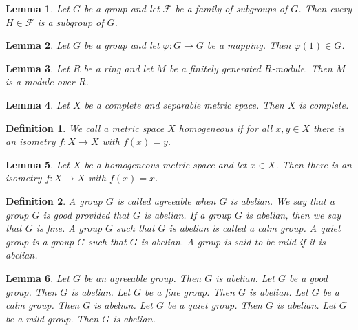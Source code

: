 \documentclass{article}
\newtheorem{lemma}{Lemma}
\newtheorem{definition}{Definition}
\begin{document}
\begin{lemma}\label{family-of-subgroups}
Let $G$ be a group and let $\mathcal{F}$ be a family of subgroups of $G$. Then every $H\in\mathcal{F}$ is a subgroup of $G$.
\end{lemma}

\begin{lemma}\label{mapping}
Let $G$ be a group and let $\varphi\colon G\to G$ be a mapping. Then $\varphi(1)\in G$.
\end{lemma}

\begin{lemma}\label{hyphen-module}
Let $R$ be a ring and let $M$ be a finitely generated $R$-module. Then $M$ is a module over $R$.
\end{lemma}

\begin{lemma}\label{and-adjectives}
Let $X$ be a complete and separable metric space. Then $X$ is complete.
\end{lemma}

\begin{definition}\label{homogeneous}
We call a metric space $X$ \emph{homogeneous} if for all $x,y\in X$ there is an isometry $f\colon X\to X$ with $f(x)=y$.
\end{definition}

\begin{lemma}\label{homogeneous-space}
Let $X$ be a homogeneous metric space and let $x\in X$. Then there is an isometry $f\colon X\to X$ with $f(x)=x$.
\end{lemma}

\begin{definition}\label{forms-of-definitions}
A group $G$ is called \emph{agreeable} when $G$ is abelian. We say that a group $G$ is \emph{good} provided that $G$ is abelian. If a group $G$ is abelian, then we say that $G$ is \emph{fine}. A group $G$ such that $G$ is abelian is called a \emph{calm group}. A \emph{quiet group} is a group $G$ such that $G$ is abelian. A group is said to be \emph{mild} if it is abelian.
\end{definition}

\begin{lemma}\label{forms-of-definitions-used}
Let $G$ be an agreeable group. Then $G$ is abelian. Let $G$ be a good group. Then $G$ is abelian. Let $G$ be a fine group. Then $G$ is abelian. Let $G$ be a calm group. Then $G$ is abelian. Let $G$ be a quiet group. Then $G$ is abelian. Let $G$ be a mild group. Then $G$ is abelian.
\end{lemma}
\end{document}
